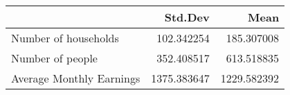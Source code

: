 \begin{tabular}{lrr}
\toprule
{} &      Std.Dev &         Mean \\
\midrule
Number of households     &   102.342254 &   185.307008 \\
Number of people         &   352.408517 &   613.518835 \\
Average Monthly Earnings &  1375.383647 &  1229.582392 \\
\bottomrule
\end{tabular}
